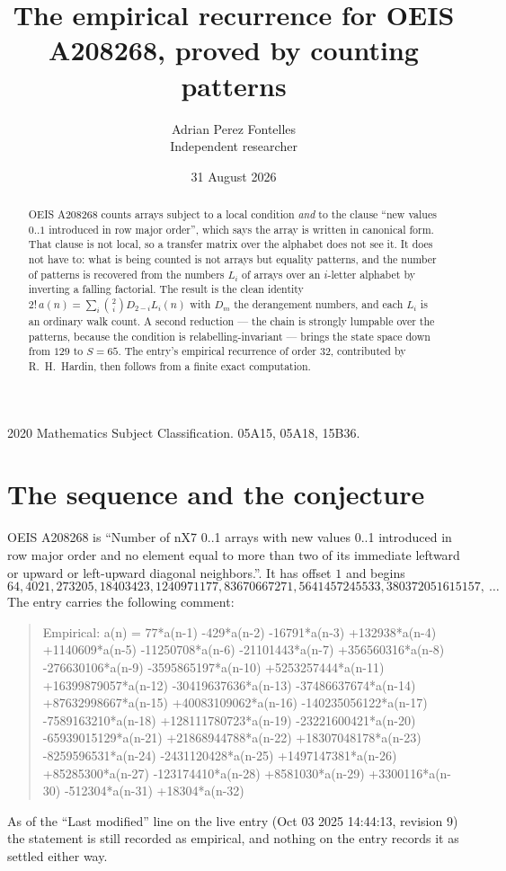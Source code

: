 \documentclass[11pt,a4paper]{article}
\title{The empirical recurrence for OEIS A208268, proved by counting patterns}
\author{Adrian Perez Fontelles\\ \small Independent researcher}
\date{31 August 2026}
\theoremstyle{plain}
\theoremstyle{definition}
\begin{document}
\maketitle

\begin{abstract}
OEIS A208268 counts arrays subject to a local condition \emph{and} to the clause ``new values
$0..1$ introduced in row major order'', which says the array is written in canonical
form. That clause is not local, so a transfer matrix over the alphabet does not see it. It
does not have to: what is being counted is not arrays but equality patterns, and the number
of patterns is recovered from the numbers $L_i$ of arrays over an $i$-letter alphabet by
inverting a falling factorial. The result is the clean identity
$2!\,a(n)=\sum_i\binom{2}{i}D_{2-i}L_i(n)$ with $D_m$ the derangement numbers,
and each $L_i$ is an ordinary walk count. A second reduction --- the chain is strongly
lumpable over the patterns, because the condition is relabelling-invariant --- brings the
state space down from $129$ to $S=65$. The entry's empirical recurrence of order
$32$, contributed by R.~H.~Hardin, then follows from a finite exact computation.
\end{abstract}

\noindent\small 2020 Mathematics Subject Classification. 05A15, 05A18, 15B36.\normalsize

\section{The sequence and the conjecture}

OEIS A208268 is ``Number of nX7 0..1 arrays with new values 0..1 introduced in row major order and no element equal to more than two of its immediate leftward or upward or left-upward diagonal neighbors.''. It has offset $1$ and begins
\[
64, 4021, 273205, 18403423, 1240971177, 83670667271, 5641457245533, 380372051615157,\ \dots
\]
The entry carries the following comment:
\begin{quote}\small
Empirical: a(n) = 77*a(n-1) -429*a(n-2) -16791*a(n-3) +132938*a(n-4) +1140609*a(n-5) -11250708*a(n-6) -21101443*a(n-7) +356560316*a(n-8) -276630106*a(n-9) -3595865197*a(n-10) +5253257444*a(n-11) +16399879057*a(n-12) -30419637636*a(n-13) -37486637674*a(n-14) +87632998667*a(n-15) +40083109062*a(n-16) -140235056122*a(n-17) -7589163210*a(n-18) +128111780723*a(n-19) -23221600421*a(n-20) -65939015129*a(n-21) +21868944788*a(n-22) +18307048178*a(n-23) -8259596531*a(n-24) -2431120428*a(n-25) +1497147381*a(n-26) +85285300*a(n-27) -123174410*a(n-28) +8581030*a(n-29) +3300116*a(n-30) -512304*a(n-31) +18304*a(n-32)
\end{quote}
As of the ``Last modified'' line on the live entry (Oct 03 2025 14:44:13, revision 9) the statement is
still recorded as empirical, and nothing on the entry records it as settled either way.
\end{document}
